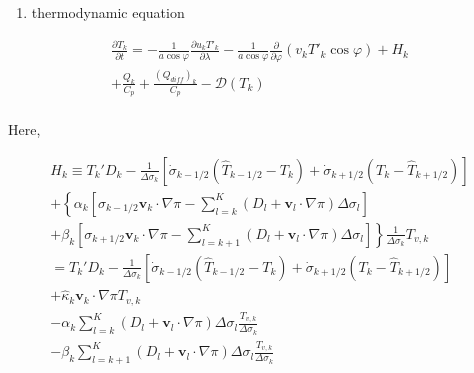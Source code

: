 \begin{enumerate}
\def\labelenumi{\arabic{enumi}.}
\setcounter{enumi}{3}
\tightlist
\item
  thermodynamic equation
\end{enumerate}

\begin{eqnarray}
  \frac{\partial T_k}{\partial t}
     =  - \frac{1}{a\cos\varphi}
               \frac{\partial u_k T'_k}{\partial \lambda}
          - \frac{1}{a\cos\varphi}
               \frac{\partial }{\partial \varphi} (v_k T'_k \cos\varphi)
          + H_k  \\
        + \frac{Q_k}{C_{p}}
          + \frac{(Q_{diff})_k}{C_p} 
          - {\mathcal D}(T_k)  \\
\end{eqnarray}

Here,

\begin{eqnarray}
   H_k 
     \equiv  T_k' D_k
              - \frac{1}{\Delta \sigma_k} 
             [   \dot{\sigma}_{k-1/2} ( \hat{T}_{k-1/2} - T_k   )
               + \dot{\sigma}_{k+1/2} ( T_k   - \hat{T}_{k+1/2} ) ]
                \\
        + \left\{ \alpha_k
                    \left[ \sigma_{k-1/2} \mathbf{v}_k \cdot \nabla \pi
                          - \sum_{l=k}^{K} 
                           ( D_l + \mathbf{v}_l \cdot \nabla \pi )
                            \Delta  \sigma_l
                    \right]
             \right.    \\
          + \left. \beta_k
                     \left[ \sigma_{k+1/2} \mathbf{v}_k \cdot \nabla \pi
                          - \sum_{l=k+1}^{K} 
                           ( D_l + \mathbf{v}_l \cdot \nabla \pi )
                            \Delta  \sigma_l
                    \right]
              \right\} 
              \frac{1}{\Delta \sigma_k} T_{v,k}   \\
%
     =  T_k' D_k 
          - \frac{1}{\Delta \sigma_k} 
             [   \dot{\sigma}_{k-1/2} ( \hat{T}_{k-1/2} - T_k   )
               + \dot{\sigma}_{k+1/2} ( T_k   - \hat{T}_{k+1/2} ) ]
                \\
        + \hat{\kappa}_k \mathbf{v}_k \cdot \nabla \pi T_{v,k} 
                \\
        - \alpha_k \sum_{l=k}^{K} 
                           ( D_l + \mathbf{v}_l \cdot \nabla \pi )
                            \Delta  \sigma_l 
                            \frac{T_{v,k}}{\Delta \sigma_k} 
                \\
        - \beta_k \sum_{l=k+1}^{K} 
                           ( D_l + \mathbf{v}_l \cdot \nabla \pi )
                            \Delta  \sigma_l 
                            \frac{T_{v,k}}{\Delta \sigma_k} 
\end{eqnarray}

